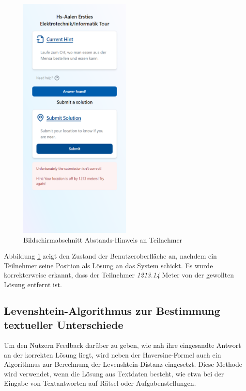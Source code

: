 \begin{figure}[H]
    \centering
    \includegraphics[width=0.5\textwidth]{images/PrAr_Impl_Geolocation-UI.png}
    \caption{Bildschirmabschnitt Abstands-Hinweis an Teilnehmer}
    \label{fig:implementierung:geolocation_ui}
\end{figure}

Abbildung \ref{fig:implementierung:geolocation_ui} zeigt den Zustand der Benutzeroberfläche an, nachdem ein Teilnehmer seine Position als Lösung an das System schickt. Es wurde korrekterweise erkannt, dass der Teilnehmer \textit{1213.14} Meter von der gewollten Lösung entfernt ist.

\subsection{Levenshtein-Algorithmus zur Bestimmung textueller Unterschiede}

Um den Nutzern Feedback darüber zu geben, wie nah ihre eingesandte Antwort an der korrekten Lösung liegt, wird neben der Haversine-Formel auch ein Algorithmus zur Berechnung der Levenshtein-Distanz eingesetzt. Diese Methode wird verwendet, wenn die Lösung aus Textdaten besteht, wie etwa bei der Eingabe von Textantworten auf Rätsel oder Aufgabenstellungen.

